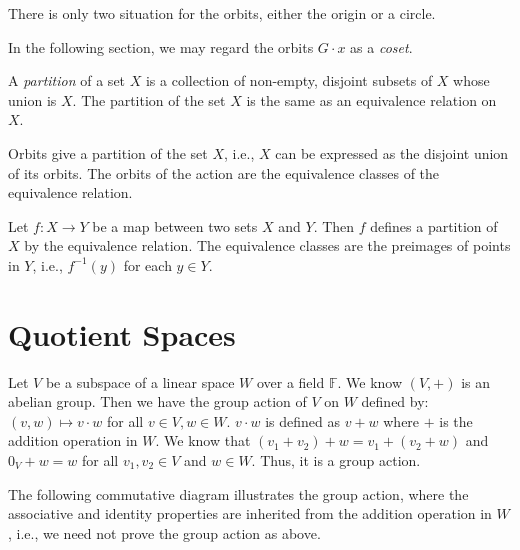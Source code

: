 \documentclass[
	11pt, %
	fleqn, %
	a4paper, %
]{LegrandOrangeBook}
\newcommand{\F}{\mathbb{F}} %
\begin{document}
There is only two situation for the orbits, either the origin or a circle.

In the following section, we may regard the orbits $G \cdot x$ as a \emph{coset}.

\begin{definition}[Partition]
    A \emph{partition} of a set $X$ is a collection of non-empty, disjoint subsets of $X$ whose union is $X$. The partition of the set $X$ is the same as an equivalence relation on $X$.
\end{definition}

Orbits give a partition of the set $X$, i.e., $X$ can be expressed as the disjoint union of its orbits. The orbits of the action are the equivalence classes of the equivalence relation.

Let $f : X \to Y$ be a map between two sets $X$ and $Y$. Then $f$ defines a partition of $X$ by the equivalence relation. The equivalence classes are the preimages of points in $Y$, i.e., $f^{-1}(y)$ for each $y \in Y$.

\newpage

\section{Quotient Spaces}

Let $V$ be a subspace of a linear space $W$ over a field $\F$. We know $(V, +)$ is an abelian group. Then we have the group action of $V$ on $W$ defined by: $(v, w) \mapsto v \cdot w$ for all $v \in V, w \in W$. $v \cdot w$ is defined as $v + w$ where $+$ is the addition operation in $W$.
We know that $(v_1 + v_2) + w = v_1 + (v_2 + w)$ and $0_V + w = w$ for all $v_1, v_2 \in V$ and $w \in W$. Thus, it is a group action. 

The following commutative diagram illustrates the group action, where the associative and identity properties are inherited from the addition operation in $W$, i.e., we need not prove the group action as above.

\begin{center}
\end{center}
\end{document}
